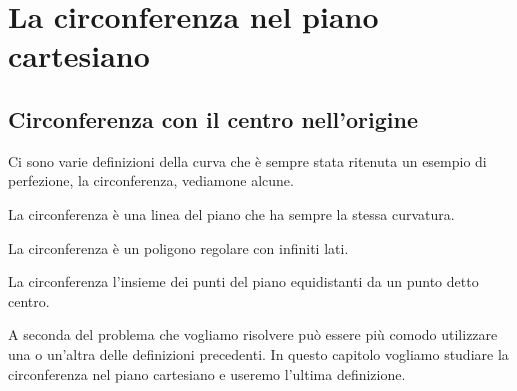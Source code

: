 

\renewcommand{\sistema}[1]{\begin{cases}#1\end{cases}}



\chapter{La circonferenza nel piano cartesiano}

\section{Circonferenza con il centro nell'origine}
\label{sec:circ_circcentroorigine}

% 

Ci sono varie definizioni della curva che è sempre stata ritenuta un esempio di 
perfezione, la circonferenza, vediamone alcune.

\begin{definizione}%
 La circonferenza è una linea del piano che ha sempre la stessa curvatura.
\end{definizione}

\begin{definizione}%
 La circonferenza è un poligono regolare con infiniti lati.
\end{definizione}

\begin{definizione}%
 La circonferenza l'insieme dei punti del piano equidistanti da un punto detto 
centro.
\end{definizione}

A seconda del problema che vogliamo risolvere può essere più comodo utilizzare 
una o un'altra delle definizioni precedenti. In questo capitolo vogliamo 
studiare la circonferenza nel piano cartesiano e useremo l'ultima definizione.



